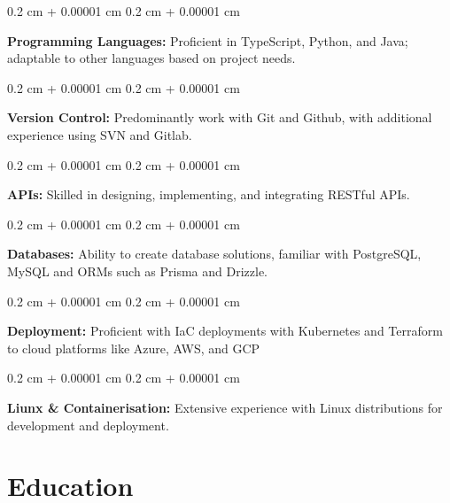\documentclass[10pt, a4paper]{article}
\newenvironment{onecolentry}{
    \begin{adjustwidth}{
        0.2 cm + 0.00001 cm
    }{
        0.2 cm + 0.00001 cm
    }
}{
    \end{adjustwidth}
} %
\begin{document}
        
        \begin{onecolentry}
            \textbf{Programming Languages:} Proficient in TypeScript, Python, and Java; adaptable to other languages based on project needs.
        \end{onecolentry}

        \vspace{0.2 cm}

        \begin{onecolentry}
            \textbf{Version Control:} Predominantly work with Git and Github, with additional experience using SVN and Gitlab.
        \end{onecolentry}

        \vspace{0.2 cm}

        \begin{onecolentry}
            \textbf{APIs:} Skilled in designing, implementing, and integrating RESTful APIs.
        \end{onecolentry}

        \vspace{0.2 cm}

        \begin{onecolentry}
            \textbf{Databases:} Ability to create database solutions, familiar with PostgreSQL, MySQL and ORMs such as Prisma and Drizzle.
        \end{onecolentry}

        \vspace{0.2 cm}

        \begin{onecolentry}
            \textbf{Deployment:} Proficient with IaC deployments with Kubernetes and Terraform to cloud platforms like Azure, AWS, and GCP
        \end{onecolentry}

        \vspace{0.2 cm}

        \begin{onecolentry}
            \textbf{Liunx \& Containerisation:} Extensive experience with Linux distributions for development and deployment.
        \end{onecolentry}


    
    \section{Education}
\end{document}
